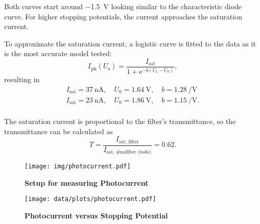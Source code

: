 Both curves start around \SI{-1.5}{\volt} looking similar to the characteristic diode curve.
For higher stopping potentials, the current approaches the saturation current.

To approximate the saturation current, a logistic curve is fitted to the data as it is the most accurate model tested:
\begin{equation*}
	I_\text{ph}(U_\text{s}) = \frac{I_\text{sat}}{1 + \mathrm{e}^{-b (U_\text{s} - U_0)}},
\end{equation*}
resulting in
\begin{gather*}
	I_\text{sat} = \SI{37}{\nA}, \quad U_0 = \SI{1.64}{\volt}, \quad b = \SI{1.28}{\per\volt} \tag{no filter}\\
	I_\text{sat} = \SI{23}{\nA}, \quad U_0 = \SI{1.86}{\volt}, \quad b = \SI{1.15}{\per\volt}. \tag{filter}\\
\end{gather*}

The saturation current is proportional to the filter's transmittance, so the transmittance can be calculated as
\begin{equation*}
	T = \frac{I_\text{sat, filter}}{I_\text{sat, \#nofilter (todo)}} = \num{0.62}.
\end{equation*}

\begin{figure}[tbp]
	\centering
	\texttt{[image: img/photocurrent.pdf]}
	\caption[Setup for measuring Photocurrent]{\textbf{Setup for measuring Photocurrent}}
	\label{sch:photocurrent}
\end{figure}

\begin{figure}[tbp]
	\centering
	\texttt{[image: data/plots/photocurrent.pdf]}
	\caption[Photocurrent versus Stopping Potential]{\textbf{Photocurrent versus Stopping Potential}}
	\label{plt:photocurrent}
\end{figure}
